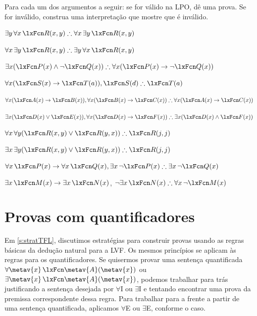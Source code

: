 \solutions
\problempart
\label{pr.FOLvalidornot}
Para cada um dos argumentos a seguir: se for válido na LPO, dê uma prova. Se for inválido, construa uma interpretação que mostre que é inválido.
\begin{compactlist}
\item $\exists y\,\forall x\,\atom{R}{x,y} \therefore \forall x\,\exists y\,\atom{R}{x,y}$
\item $\forall x\,\exists y\,\atom{R}{x,y} \therefore  \exists y\,\forall x\,\atom{R}{x,y}$
\item $\exists x(\atom{P}{x} \eand \enot \atom{Q}{x}) \therefore \forall x(\atom{P}{x} \eif \enot \atom{Q}{x})$
\item $\forall x(\atom{S}{x} \eif \atom{T}{a}), \atom{S}{d} \therefore \atom{T}{a}$
\item $\forall x(\atom{A}{x}\eif \atom{B}{x}), \forall x(\atom{B}{x} \eif \atom{C}{x}) \therefore \forall x(\atom{A}{x} \eif \atom{C}{x})$
\item $\exists x(\atom{D}{x} \eor \atom{E}{x}), \forall x(\atom{D}{x} \eif \atom{F}{x}) \therefore \exists x(\atom{D}{x} \eand \atom{F}{x})$
\item $\forall x\,\forall y(\atom{R}{x,y} \eor \atom{R}{y,x}) \therefore \atom{R}{j,j}$
\item $\exists x\,\exists y(\atom{R}{x,y} \eor \atom{R}{y,x}) \therefore \atom{R}{j,j}$
\item $\forall x\,\atom{P}{x} \eif \forall x\,\atom{Q}{x}, \exists x\, \enot\atom{P}{x} \therefore \exists x\, \enot \atom{Q}{x}$
\item $\exists x\,\atom{M}{x} \eif \exists x\,\atom{N}{x}$, $\enot \exists x\,\atom{N}{x}\therefore  \forall x\, \enot \atom{M}{x}$
\end{compactlist}

\chapter{Provas com quantificadores}

Em \cref{s:stratTFL}, discutimos estratégias para construir provas
usando as regras básicas da dedução natural para a LVF. Os mesmos
princípios se aplicam às regras para os quantificadores. Se quisermos provar
uma sentença quantificada $\forall \metav{x}\,
\atom{\metav{A}}{\metav{x}}$ ou $\exists \metav{x}\,
\atom{\metav{A}}{\metav{x}}$, podemos trabalhar para trás justificando a
sentença desejada por $\forall$I ou $\exists$I e tentando encontrar uma
prova da premissa correspondente dessa regra. Para trabalhar para a frente
a partir de uma sentença quantificada, aplicamos $\forall$E ou $\exists$E, conforme
o caso.

